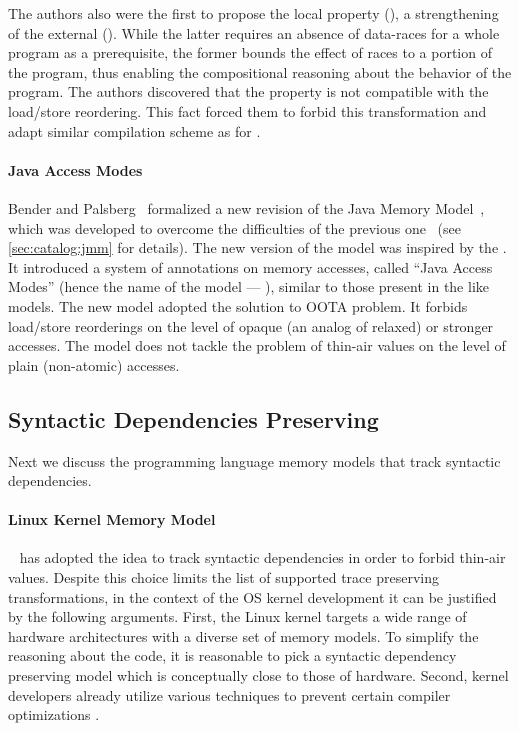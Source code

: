 The authors also were the first to propose the local \DRF property (\lDRF),
a strengthening of the external \DRF (\eDRF). 
While the latter requires an absence of data-races 
for a whole program as a prerequisite, 
the former bounds the effect of races 
to a portion of the program, thus 
enabling the compositional reasoning 
about the behavior of the program. 
The authors discovered that the \lDRF property 
is not compatible with the load/store reordering.
This fact forced them to forbid this transformation
and adapt similar compilation scheme as for \RCMM. 

\paragraph{Java Access Modes}

Bender and Palsberg~\cite{Bender-Palsberg:OOPSLA19} formalized a new revision 
of the Java Memory Model~\cite{JDK9-VarHandle, JEP:193, JDK9-Modes}, 
which was developed to overcome 
the difficulties of the previous one~\cite{Manson-al:POPL05}
(see \ref{sec:catalog:jmm} for details).
The new version of the model was inspired by the \RCMM. 
It introduced a system of annotations on memory accesses, 
called ``Java Access Modes'' (hence the name of the model --- \JAM),
similar to those present in the \CMM like models.
The new model adopted the \RCMM solution to OOTA problem. 
It forbids load/store reorderings on the level of 
opaque (an analog of \CPP relaxed) or stronger accesses.
The model does not tackle the problem of 
thin-air values on the level of plain (\ie non-atomic) accesses.

\subsection{Syntactic Dependencies Preserving}
\label{sec:catalog:deprf}

Next we discuss the programming language memory models 
that track syntactic dependencies.

\paragraph{Linux Kernel Memory Model}

\LKMM~\cite{Alglave-al:ASPLOS18} has adopted 
the idea to track syntactic dependencies in order to 
forbid thin-air values. Despite this choice 
limits the list of supported trace preserving transformations,
in the context of the OS kernel development 
it can be justified by the following arguments. 
First, the Linux kernel targets 
a wide range of hardware architectures with a diverse
set of memory models. To simplify the reasoning about the code, 
it is reasonable to pick a syntactic dependency preserving
model which is conceptually close to those of hardware. 
Second, kernel developers already utilize 
various techniques to prevent certain compiler optimizations%
\cite{Alglave-al:ASPLOS18, LK-MemBarriers, LK-RCU-Deref}.

